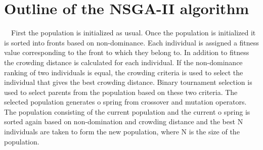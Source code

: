 \section[Outline of the NSGA-II algorithm]{\label{identificadorReferenciaCruzada}
Outline of the NSGA-II algorithm}

\ \ First the population is initialized as usual. Once the population is initialized it is sorted into fronts based on non-dominance. Each individual is assigned a fitness value corresponding to the front to which they belong to. In addition to fitness the crowding distance is calculated for each individual. If the non-dominance ranking of two individuals is equal, the crowding criteria is used to select the individual that gives the best crowding distance. Binary tournament selection is used to select parents from the population based on these two criteria. The selected population generates o spring from crossover and mutation operators. The population consisting of the current population and the current o spring is sorted again based on non-domination and crowding distance and the best N individuals are taken to form the new population, where N is the size of the population.